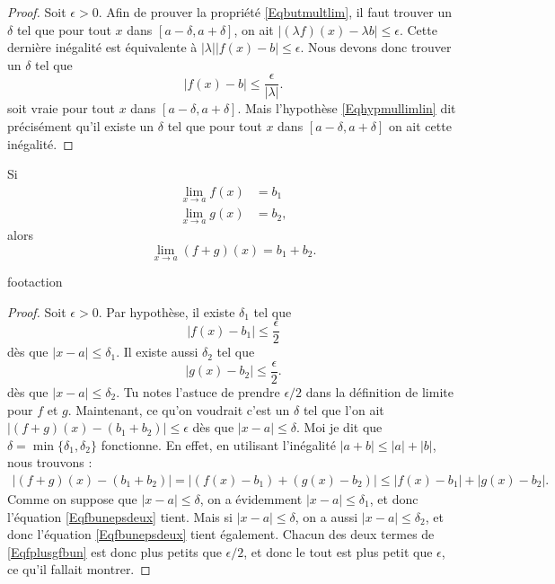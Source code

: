 \begin{proof}
Soit $\epsilon>0$. Afin de prouver la propriété \eqref{Eqbutmultlim}, il faut trouver un $\delta$ tel que pour tout $x$ dans $[a-\delta,a+\delta]$, on ait $| (\lambda f)(x)- \lambda b |\leq\epsilon$. Cette dernière inégalité est équivalente à $|\lambda|| f(x)-b |\leq\epsilon$. Nous devons donc trouver un $\delta$ tel que
\begin{equation}
| f(x)-b |\leq\frac{ \epsilon }{ | \lambda | }.
\end{equation}
soit vraie pour tout $x$ dans $[a-\delta,a+\delta]$. Mais l'hypothèse \eqref{Eqhypmullimlin} dit précisément qu'il existe un $\delta$ tel que pour tout $x$ dans $[a-\delta,a+\delta]$ on ait cette inégalité.
\end{proof}

\begin{theorem}     \label{ThoLimLin}
    Si
    \begin{subequations}
    \begin{align}
        \lim_{x\to a}f(x)&=b_1\\
        \lim_{x\to a}g(x)&=b_2,
    \end{align}
    \end{subequations}
    alors
    \begin{equation}
        \lim_{x\to a}(f+g)(x)=b_1+b_2.
    \end{equation}
\end{theorem}


    footaction

\begin{proof}
    Soit $\epsilon>0$. Par hypothèse, il existe $\delta_1$ tel que
    \begin{equation}    \label{Eqfbunepsdeux}
      | f(x)-b_1 |\leq \frac{ \epsilon }{ 2 }
    \end{equation}
    dès que $| x-a |\leq\delta_1$. Il existe aussi $\delta_2$ tel que
    \begin{equation}    \label{Eqgbdeuxepsdeux}
      | g(x)-b_2 |\leq \frac{ \epsilon }{ 2 }.
    \end{equation}
    dès que $| x-a |\leq \delta_2$. Tu notes l'astuce de prendre $\epsilon/2$ dans la définition de limite pour $f$ et $g$. Maintenant, ce qu'on voudrait c'est un $\delta$ tel que l'on ait $| (f+g)(x)-(b_1+b_2) |\leq \epsilon$ dès que $| x-a |\leq \delta$. Moi je dit que $\delta=\min\{ \delta_1,\delta_2 \}$ fonctionne. En effet, en utilisant l'inégalité $| a+b |\leq | a |+| b |$, nous trouvons :
    \begin{align}
    | (f+g)(x)-(b_1+b_2) |=| (f(x)-b_1)+(g(x)-b_2) |
            \leq | f(x)-b_1 |+| g(x)-b_2 |.     \label{Eqfplusgfbun}
    \end{align}
    Comme on suppose que $| x-a |\leq\delta$, on a évidemment $| x-a |\leq\delta_1$, et donc l'équation \eqref{Eqfbunepsdeux} tient. Mais si $| x-a |\leq\delta$, on a aussi $| x-a |\leq\delta_2$, et donc l'équation  \eqref{Eqfbunepsdeux} tient également. Chacun des deux termes de \eqref{Eqfplusgfbun} est donc plus petits que $\epsilon/2$, et donc le tout est plus petit que $\epsilon$, ce qu'il fallait montrer.

\end{proof}

